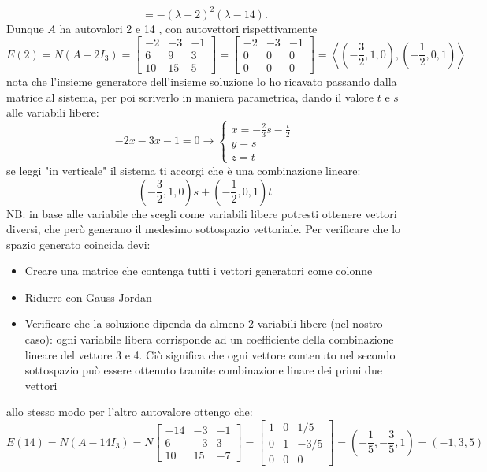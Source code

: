 \documentclass[12pt,a4paper,oneside]{article}
\begin{document}
\[
	=-(\lambda-2)^2(\lambda-14) .
\]
Dunque $A$ ha autovalori 2 e 14 , con autovettori rispettivamente
\[
	E(2)=N\left(A-2 I_3\right)=
	\begin{bmatrix}
		-2 & -3 & -1 \\
		6  & 9  & 3  \\
		10 & 15 & 5
	\end{bmatrix}
	=
	\begin{bmatrix}
		-2 & -3 & -1 \\
		0  & 0  & 0  \\
		0  & 0  & 0
	\end{bmatrix}
	=\left<\left( -\frac{3}{2}, 1, 0 \right) , \left( -\frac{1}{2},0,1 \right)  \right>
\]
nota che l'insieme generatore dell'insieme soluzione lo ho ricavato passando dalla matrice al sistema, per poi scriverlo in maniera parametrica, dando il valore $ t $ e $ s $ alle variabili libere:
\[
	-2x -3x -1 = 0 \rightarrow
	\begin{cases}
		x = -\frac{2}{3}s - \frac{t}{2} \\
		y = s                           \\
		z = t
	\end{cases}
\]
se leggi "in verticale" il sistema ti accorgi che è una combinazione lineare:
\[
	\left( -\frac{3}{2}, 1, 0 \right) s + \left( -\frac{1}{2}, 0, 1\right)t
\]
NB: in base alle variabile che scegli come variabili libere potresti ottenere vettori diversi, che però generano il medesimo sottospazio vettoriale. Per verificare che lo spazio generato coincida devi:
\begin{itemize}
	\item Creare una matrice che contenga tutti i vettori generatori come colonne
	\item Ridurre con Gauss-Jordan
	\item Verificare che la soluzione dipenda da almeno 2 variabili libere (nel nostro caso): ogni variabile libera corrisponde ad un coefficiente della combinazione lineare del vettore 3 e 4. Ciò significa che ogni vettore contenuto nel secondo sottospazio può essere ottenuto tramite combinazione linare dei primi due vettori
\end{itemize}
allo stesso modo per l'altro autovalore ottengo che:
\[
	E(14)=N\left(A-14 I_3\right)=N
	\begin{bmatrix}
		-14 & -3 & -1 \\
		6   & -3 & 3  \\
		10  & 15 & -7
	\end{bmatrix}
	=
	\begin{bmatrix}
		1 & 0 & 1 / 5  \\
		0 & 1 & -3 / 5 \\
		0 & 0 & 0
	\end{bmatrix}
	= \left( -\frac{1}{5}, - \frac{3}{5}, 1 \right) = \left( -1,3,5 \right)
\]
\end{document}
